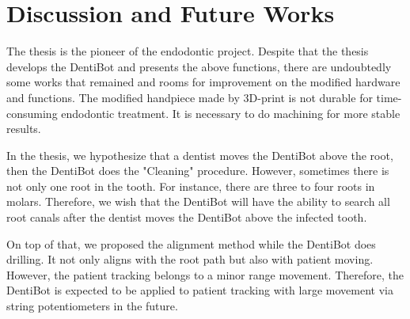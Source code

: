 \section{Discussion and Future Works}
\hspace*{6mm}The thesis is the pioneer of the endodontic project. Despite that the thesis develops the DentiBot and presents the above functions, there are undoubtedly some works that remained and rooms for improvement on the modified hardware and functions. The modified handpiece made by 3D-print is not durable for time-consuming endodontic treatment. It is necessary to do machining for more stable results. 
\par 
In the thesis, we hypothesize that a dentist moves the DentiBot above the root, then the DentiBot does the "Cleaning" procedure. However, sometimes there is not only one root in the tooth. For instance, there are three to four roots in molars. Therefore, we wish that the DentiBot will have the ability to search all root canals after the dentist moves the DentiBot above the infected tooth. 
\par
On top of that, we proposed the alignment method while the DentiBot does drilling. It not only aligns with the root path but also with patient moving. However, the patient tracking belongs to a minor range movement. Therefore, the DentiBot is expected to be applied to patient tracking with large movement via string potentiometers in the future.			